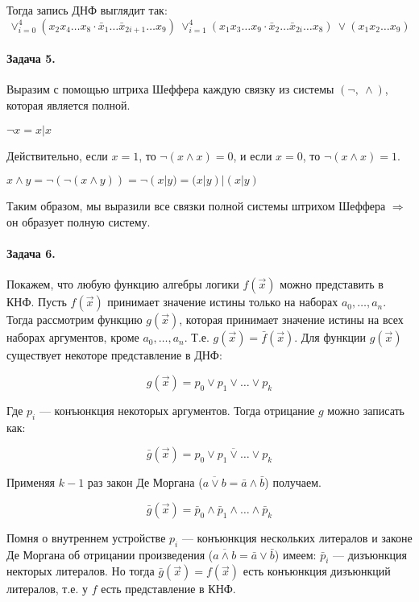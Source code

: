 \documentclass{article}
\begin{document}
    Тогда запись ДНФ выглядит так:
    $$ \vee_{i=0}^{4} (x_2x_4\ldots x_8 \cdot \bar{x}_1 \ldots \bar{x}_{2i + 1} \ldots x_9)\  \vee_{i=1}^{4} (x_1x_3\ldots x_9 \cdot \bar{x}_2 \ldots \bar{x}_{2i} \ldots x_8)\ \vee (x_1x_2\ldots x_9)$$
     \paragraph{Задача 5.}
     Выразим с помощью штриха Шеффера каждую связку из системы $(\neg,\ \wedge)$, которая является полной.

     $\neg x = x | x$

     Действительно, если $x = 1$, то $\neg (x \wedge x) = 0$, и если $x = 0$, то $\neg (x\wedge x) =1$.

     $x \wedge y = \neg(\neg(x \wedge y)) = \neg(x | y) = (x | y) | (x | y)$

     Таким образом, мы выразили все связки полной системы штрихом Шеффера $\Rightarrow$ он образует полную систему.
     
     \paragraph{Задача 6.}
     Покажем, что любую функцию алгебры логики $f(\vec{x})$ можно представить в КНФ.
     Пусть $f(\vec{x})$ принимает значение истины только на наборах $a_0, \ldots, a_n$. Тогда рассмотрим функцию $g(\vec{x})$, которая принимает значение истины на всех наборах аргументов, кроме $a_0, \ldots, a_n$. Т.е. $g(\vec{x}) = \bar{f}(\vec{x})$. Для функции $g(\vec{x})$ существует некоторе представление в ДНФ:
     
          $$ g(\vec{x}) = p_0 \vee p_1 \vee \ldots \vee p_k $$

    Где $p_i$ --- конъюнкция некоторых аргументов. Тогда отрицание $g$ можно записать как:

          $$ \bar{g}(\vec{x}) = \overline{p_0 \vee p_1 \vee \ldots \vee p_k} $$

    Применяя $k - 1$ раз закон Де Моргана ($\overline{a \vee b} = \bar{a} \wedge \bar{b} $) получаем.

        $$ \bar{g}(\vec{x}) = \bar{p}_0 \wedge \bar{p}_1 \wedge \ldots \wedge \bar{p}_k $$

    Помня о внутреннем устройстве $p_i$ --- конъюнкция нескольких литералов и законе Де Моргана об отрицании произведения ($\overline{a \wedge b} = \bar{a} \vee \bar{b} $) имеем: $\bar{p}_i$ --- дизъюнкция некторых литералов.
    Но тогда $\bar{g}(\vec{x}) = f(\vec{x})$ есть конъюнкция дизъюнкций литералов, т.е. у $f$ есть представление в КНФ.
\end{document}

